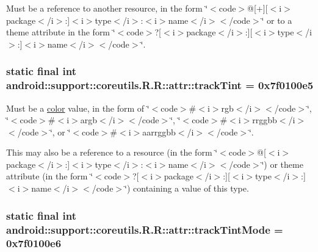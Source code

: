 Must be a reference to another resource, in the form \char`\"{}$<$code$>$@\mbox{[}+\mbox{]}\mbox{[}$<$i$>$package$<$/i$>$:\mbox{]}$<$i$>$type$<$/i$>$:$<$i$>$name$<$/i$>$$<$/code$>$\char`\"{} or to a theme attribute in the form \char`\"{}$<$code$>$?\mbox{[}$<$i$>$package$<$/i$>$:\mbox{]}\mbox{[}$<$i$>$type$<$/i$>$:\mbox{]}$<$i$>$name$<$/i$>$$<$/code$>$\char`\"{}. \hypertarget{classandroid_1_1support_1_1coreutils_1_1_r_1_1attr_a009dfb1a7fa2c67b2845424cabc7153}{
\subsubsection[{trackTint}]{\setlength{\rightskip}{0pt plus 5cm}static final int android::support::coreutils.R.R::attr::trackTint = 0x7f0100e5}}
\label{classandroid_1_1support_1_1coreutils_1_1_r_1_1attr_a009dfb1a7fa2c67b2845424cabc7153}


Must be a \hyperlink{classandroid_1_1support_1_1coreutils_1_1_r_1_1color}{color} value, in the form of \char`\"{}$<$code$>$\#$<$i$>$rgb$<$/i$>$$<$/code$>$\char`\"{}, \char`\"{}$<$code$>$\#$<$i$>$argb$<$/i$>$$<$/code$>$\char`\"{}, \char`\"{}$<$code$>$\#$<$i$>$rrggbb$<$/i$>$$<$/code$>$\char`\"{}, or \char`\"{}$<$code$>$\#$<$i$>$aarrggbb$<$/i$>$$<$/code$>$\char`\"{}. 

This may also be a reference to a resource (in the form \char`\"{}$<$code$>$@\mbox{[}$<$i$>$package$<$/i$>$:\mbox{]}$<$i$>$type$<$/i$>$:$<$i$>$name$<$/i$>$$<$/code$>$\char`\"{}) or theme attribute (in the form \char`\"{}$<$code$>$?\mbox{[}$<$i$>$package$<$/i$>$:\mbox{]}\mbox{[}$<$i$>$type$<$/i$>$:\mbox{]}$<$i$>$name$<$/i$>$$<$/code$>$\char`\"{}) containing a value of this type. \hypertarget{classandroid_1_1support_1_1coreutils_1_1_r_1_1attr_bffb84dbcfa3d2badafa9650ed941747}{
\subsubsection[{trackTintMode}]{\setlength{\rightskip}{0pt plus 5cm}static final int android::support::coreutils.R.R::attr::trackTintMode = 0x7f0100e6}}
\label{classandroid_1_1support_1_1coreutils_1_1_r_1_1attr_bffb84dbcfa3d2badafa9650ed941747}


